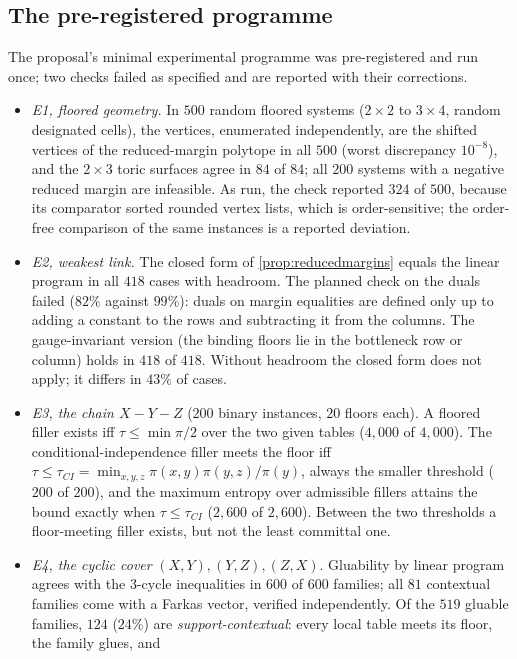 \documentclass[11pt]{article}
\theoremstyle{definition}
\theoremstyle{remark}
\begin{document}
\subsection{The pre-registered programme}
The proposal's minimal experimental programme was pre-registered and run once; two checks failed as specified and are reported
with their corrections.
\begin{itemize}[leftmargin=*,nosep]
\item \emph{E1, floored geometry.} In $500$ random floored systems ($2\times2$ to $3\times4$, random designated cells), the vertices,
  enumerated independently, are the shifted vertices of the reduced-margin polytope in all $500$ (worst discrepancy $10^{-8}$), and
  the $2\times3$ toric surfaces agree in $84$ of $84$; all $200$ systems with a negative reduced margin are infeasible. As run, the
  check reported $324$ of $500$, because its comparator sorted rounded vertex lists, which is order-sensitive; the order-free
  comparison of the same instances is a reported deviation.
\item \emph{E2, weakest link.} The closed form of \cref{prop:reducedmargins} equals the linear program in all $418$ cases with
  headroom. The planned check on the duals failed ($82\%$ against $99\%$): duals on margin equalities are defined only up to adding a
  constant to the rows and subtracting it from the columns. The gauge-invariant version (the binding floors lie in the bottleneck
  row or column) holds in $418$ of $418$. Without headroom the closed form does not apply; it differs in $43\%$ of cases.
\item \emph{E3, the chain $X-Y-Z$} ($200$ binary instances, $20$ floors each). A floored filler exists iff $\tau\le\min\pi/2$ over the
  two given tables ($4{,}000$ of $4{,}000$). The conditional-independence filler meets the floor iff
  $\tau\le\tau_{CI}=\min_{x,y,z}\pi(x,y)\pi(y,z)/\pi(y)$, always the smaller threshold ($200$ of $200$), and the maximum entropy over
  admissible fillers attains the bound exactly when $\tau\le\tau_{CI}$ ($2{,}600$ of $2{,}600$). Between the two thresholds a
  floor-meeting filler exists, but not the least committal one.
\item \emph{E4, the cyclic cover} $(X,Y),(Y,Z),(Z,X)$. Gluability by linear program agrees with the $3$-cycle inequalities
  \cite{AraujoEtAl2013} in $600$ of $600$ families; all $81$ contextual families come with a Farkas vector, verified independently. Of
  the $519$ gluable families, $124$ ($24\%$) are \emph{support-contextual}: every local table meets its floor, the family glues, and

\end{itemize}
\end{document}
